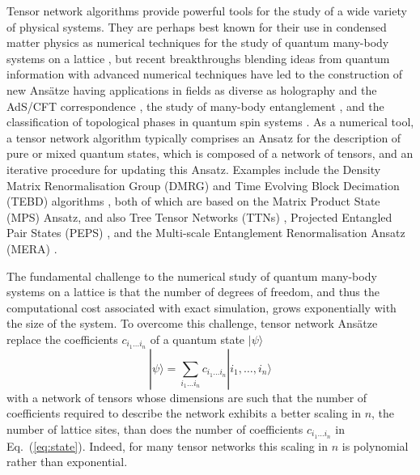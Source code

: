\documentclass[aps,pre,reprint,superscriptaddress,amsfonts,amsmath,showpacs,nofootinbib,floatfix]{revtex4-1}
\newcommand{\Eref}[1]{Eq.~(\ref{#1})}
\newcommand{\ra}{\rangle}
\begin{document}
Tensor network algorithms provide powerful tools for the study of a wide variety of physical systems. They are perhaps best known for their use in condensed matter physics as numerical techniques for the study of quantum many-body systems on a lattice \cite[e.g.][]{feiguin2007,trebst2008,konig2010,pfeifer2009,pfeifer2010,cincio2008,evenbly2009,evenbly2009b,evenbly2010a,noack1993,fannes1992,friedman1997,otsuka1996,tagliacozzo2009,murg2007,murg2009,muth2010,murg2010,montangero2009,corboz2010,corboz2010a,corboz2012,corboz2011,yan2011,depenbrock2012}, %
but recent 
breakthroughs 
blending ideas from quantum information with advanced numerical techniques 
have led to the construction of new Ans\"atze \cite[e.g.][]{vidal2007,vidal2008a,evenbly2009,evenbly2009b,vidal2010,evenbly2011} having applications in fields as diverse as holography and the AdS/CFT correspondence \cite{swingle2012,swingle2012a,singh2013}, the study of many-body entanglement \cite{vidal2007,tagliacozzo2009,evenbly2011,evenbly2014a}, and the classification of topological phases in quantum spin systems \cite{chen2011,chen2011a,schuch2011,cincio2013}. As a numerical tool, a tensor network algorithm typically comprises an Ansatz for the description of pure or mixed quantum states, which is composed of a network of tensors, and an iterative procedure for updating this Ansatz. %
Examples include the Density Matrix Renormalisation Group (DMRG) \cite{white1992,schollwock2011} and Time Evolving Block Decimation (TEBD) algorithms \cite{vidal2004,vidal2007b}, both of which are based on the Matrix Product State (MPS) 
Ansatz, and also Tree Tensor Networks (TTNs) \cite{shi2006}, Projected Entangled Pair States (PEPS) \cite{verstraete2004,jordan2008}, and the Multi-scale Entanglement Renormalisation Ansatz (MERA) \cite{vidal2007,vidal2008a,vidal2010,evenbly2009,evenbly2009b,evenbly2011,evenbly2014b}. 

The fundamental challenge to the numerical study of quantum many-body systems on a lattice is that the number of degrees of freedom, and thus the computational cost associated with exact simulation, grows exponentially with the size of the system. To overcome this challenge, tensor network Ans\"atze replace the coefficients $c_{i_1\ldots i_n}$ of a quantum state $|\psi\ra$
\begin{equation}
|\psi\ra=\sum_{i_1\ldots i_n}c_{i_1\ldots i_n}|i_1,\ldots,i_n\ra\label{eq:state}
\end{equation}
with a network of tensors whose dimensions are such that the number of coefficients required to describe the network exhibits a better scaling in $n$, the number of lattice sites, than does the number of coefficients $c_{i_1\ldots i_n}$ in \Eref{eq:state}. Indeed, for many tensor networks this scaling in $n$ is polynomial rather than exponential.
\end{document}
